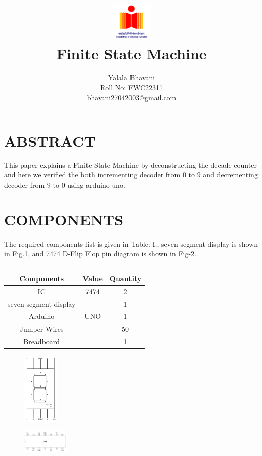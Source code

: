 \documentclass[conference]{IEEEtran}
\title{
\vspace{1cm}
{\includegraphics[width=0.15\textwidth]{1.jpg} \\ Finite State Machine} }
\author{Yalala Bhavani \\ Roll No: FWC22311 \\ bhavani27042003@gmail.com}
\begin{document}
\maketitle
 \section {ABSTRACT}
 This paper explains a Finite State Machine by deconstructing the decade counter and here we verified the both incrementing decoder from $0$ to $9$ and decrementing decoder from $9$ to $0$ using arduino uno.

\section{COMPONENTS}
The required components list is given in Table: I., seven segment display is shown in Fig.1, and 7474 D-Flip Flop pin diagram is shown in Fig-2.
\vspace{0.3cm}
 \begin{table} [htbp]
\centering
\begin{tabular}{| c | c | c |} \hline
Components & Value & Quantity \\\hline
IC & 7474 & 2 \\ \hline
seven segment display & & 1\\ \hline
Arduino & UNO & 1 \\ \hline
Jumper Wires &  & 50 \\ \hline
Breadboard & & 1 \\ 
\hline
\end{tabular}
\vspace{0.3cm}
\caption{\label{tab:widgets}}
\end{table}

\begin{figure}[h]                           
\centering                                 
\includegraphics[width=0.15\textwidth]{2.jpg}                                           
\caption{\label{fig-1:Gates}}               
\end{figure}

\begin{figure}[h]                           
\centering                                 
\includegraphics[width=0.2\textwidth]{3.jpg  }                                           
\caption{\label{fig-2:Gates}}               
\end{figure}
\end{document}
